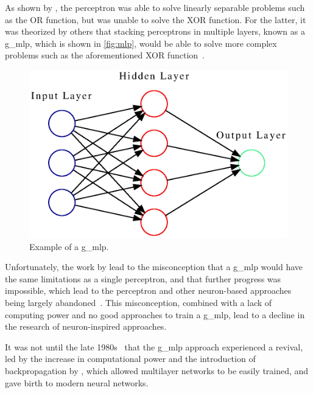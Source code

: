 \par
As shown by \textcite{perceptron3}, the perceptron was able to solve linearly separable problems such as the OR function, but was unable to solve the XOR function. For the latter, it was theorized by others that stacking perceptrons in multiple layers, known as a \gls*{g_mlp}, which is shown in \autoref{fig:mlp}, would be able to solve more complex problems such as the aforementioned XOR function~\cite{perceptron_misconceptions}.
\par
\begin{figure}[H]
    \centering
    \includegraphics[width=\linewidth]{resources/related_works/mlp.gv.eps}
    \caption[MLP Example]{Example of a \gls*{g_mlp}.}
    \label{fig:mlp}
\end{figure}
Unfortunately, the work by \textcite{perceptron3} lead to the misconception that a \gls*{g_mlp} would have the same limitations as a single perceptron, and that further progress was impossible, which lead to the perceptron and other neuron-based approaches being largely abandoned~\cite{perceptron_misconceptions}. This misconception, combined with a lack of computing power and no good approaches to train a \gls*{g_mlp}, lead to a decline in the research of neuron-inspired approaches.
\par
It was not until the late 1980s~\cite{perceptron_misconceptions} that the \gls*{g_mlp} approach experienced a revival, led by the increase in computational power and the introduction of backpropagation by \textcite{backprop}, which allowed multilayer networks to be easily trained, and gave birth to modern neural networks.
